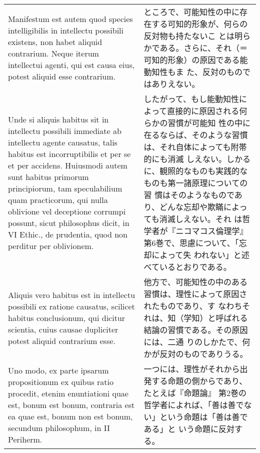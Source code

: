 \documentclass[10pt]{jsarticle} %
\begin{document}
\begin{longtable}{p{21em}p{21em}}
\\


Manifestum est autem quod species intelligibilis in intellectu
possibili existens, non habet aliquid contrarium. Neque iterum
intellectui agenti, qui est causa eius, potest aliquid esse
contrarium.


&

ところで、可能知性の中に存在する可知的形象が、何らの反対物も持たないこ
とは明らかである。さらに、それ（＝可知的形象）の原因である能動知性もま
た、反対のものではありえない。

\\


Unde si aliquis habitus sit in intellectu possibili immediate ab
intellectu agente causatus, talis habitus est incorruptibilis et per
se et per accidens. Huiusmodi autem sunt habitus primorum
principiorum, tam speculabilium quam practicorum, qui nulla oblivione
vel deceptione corrumpi possunt, sicut philosophus dicit, in VI
Ethic., de prudentia, quod non perditur per oblivionem.


&

したがって、もし能動知性によって直接的に原因される何らかの習慣が可能知
性の中に在るならば、そのような習慣は、それ自体によっても附帯的にも消滅
しえない。しかるに、観照的なものも実践的なものも第一諸原理についての習
慣はそのようなものであり、どんな忘却や欺瞞によっても消滅しえない。それ
は哲学者が『ニコマコス倫理学』第6巻で、思慮について、「忘却によって失
われない」と述べているとおりである。

\\


Aliquis vero habitus est in intellectu possibili ex ratione causatus,
scilicet habitus conclusionum, qui dicitur scientia, cuius causae
dupliciter potest aliquid contrarium esse.


&

他方で、可能知性の中のある習慣は、理性によって原因されたものであり、す
なわちそれは、知（学知）と呼ばれる結論の習慣である。その原因には、二通
りのしかたで、何かが反対のものでありうる。

\\


Uno modo, ex parte ipsarum propositionum ex quibus ratio procedit,
etenim enuntiationi quae est, bonum est bonum, contraria est ea quae
est, bonum non est bonum, secundum philosophum, in II Periherm.


&

一つには、理性がそれから出発する命題の側からであり、たとえば『命題論』
第2巻の哲学者によれば、「善は善でない」という命題は「善は善である」と
いう命題に反対する。



\end{longtable}
\end{document}
